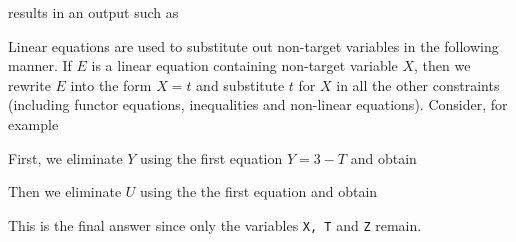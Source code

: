 \noindent
results in an output such as


\noindent
Linear equations are used to substitute out non-target variables
in the following manner.  If $E$ is a linear
equation containing non-target variable $X$, then we rewrite $E$
into the form $X = t$ and substitute $t$ for $X$ in all the other
constraints (including functor equations, inequalities and non-linear
equations).  Consider, for example


\noindent 
First, we eliminate $Y$ using the first equation $Y = 3 - T$ 
and obtain


\noindent
Then we eliminate $U$ using the the first equation and obtain


\noindent
This is the final answer since only the variables {\tt X, T} and {\tt Z}
remain.

